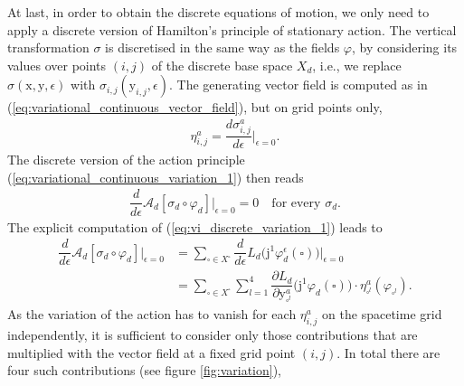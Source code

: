 \documentclass[12pt,a4paper,reqno]{article}
\begin{document}
At last, in order to obtain the discrete equations of motion, we only need to apply a discrete version of Hamilton's principle of stationary action.
The vertical transformation $\sigma$ is discretised in the same way as the fields ${\ensuremath{\varphi}}$, by considering its values over points $(i,j)$ of the discrete base space $X_{d}$, i.e., we replace $\sigma ({\ensuremath{{\ensuremath{\mathrm{{x}}}}}}, {\ensuremath{{\ensuremath{\mathrm{{y}}}}}}, {\ensuremath{\epsilon}})$ with $\sigma_{i,j} ({\ensuremath{{\ensuremath{\mathrm{{y}}}}}}_{i,j}, {\ensuremath{\epsilon}})$.
The generating vector field is computed as in (\ref{eq:variational_continuous_vector_field}), but on grid points only,
\begin{align}\label{eq:vi_discrete_vector_field}
\eta_{i,j}^{a} = \dfrac{d\sigma_{i,j}^{a}}{d{\ensuremath{\epsilon}}} \bigg\vert_{{\ensuremath{\epsilon}}=0} .
\end{align}
The discrete version of the action principle (\ref{eq:variational_continuous_variation_1}) then reads
\begin{align}\label{eq:vi_discrete_variation_1}
\dfrac{d}{d{\ensuremath{\epsilon}}} \mathcal{A}_{d} [ \sigma_{d} \circ {\ensuremath{\varphi}}_{d} ] \bigg\vert_{{\ensuremath{\epsilon}}=0} = 0
\quad
\text{for every $\sigma_{d}$} .
\end{align}
The explicit computation of (\ref{eq:vi_discrete_variation_1}) leads to
\begin{align}
\nonumber
\dfrac{d}{d{\ensuremath{\epsilon}}} \mathcal{A}_{d} [ \sigma_{d} \circ {\ensuremath{\varphi}}_{d} ] \bigg\vert_{{\ensuremath{\epsilon}}=0}
&= \sum \limits_{\square \in X^{\square}} \dfrac{d}{d{\ensuremath{\epsilon}}} L_{d} \big( {\ensuremath{\mathrm{j}}}^{1} {\ensuremath{\varphi}}_{d}^{\ensuremath{\epsilon}} (\square) \big) \bigg\vert_{{\ensuremath{\epsilon}}=0} \\
\label{eq:vi_discrete_variation_3}
&= \sum \limits_{\square \in X^{\square}} \sum \limits_{l=1}^{4} \dfrac{\partial L_{d}}{\partial {\ensuremath{{\ensuremath{\mathrm{{y}}}}}}_{\square^{l}}^{a}} \big( {\ensuremath{\mathrm{j}}}^{1} {\ensuremath{\varphi}}_{d} (\square) \big) \cdot \eta_{\square^{l}}^{a}  ({\ensuremath{\varphi}}_{\square^{l}}) .
\end{align}
As the variation of the action has to vanish for each $\eta_{i,j}^{a}$ on the spacetime grid independently, it is sufficient to consider only those contributions that are multiplied with the vector field at a fixed grid point $(i,j)$.
In total there are four such contributions (see figure \ref{fig:variation}),
\end{document}
